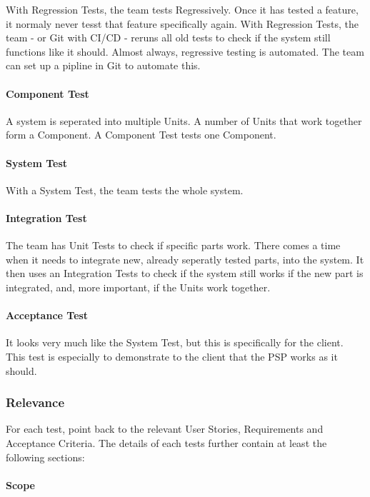 \documentclass[10pt]{report}
\begin{document}
With Regression Tests, the team tests Regressively. Once it has tested a feature, it normaly never tesst that feature specifically again. With Regression Tests, the team - or Git with CI/CD - reruns all old tests to check if the system still functions like it should. Almost always, regressive testing is automated. The team can set up a pipline in Git to automate this.

\paragraph{Component Test}

A system is seperated into multiple Units. A number of Units that work together form a Component. A Component Test tests one Component.

\paragraph{System Test}

With a System Test, the team tests the whole system.

\paragraph{Integration Test}

The team has Unit Tests to check if specific parts work. There comes a time when it needs to integrate new, already seperatly tested parts, into the system. It then uses an Integration Tests to check if the system still works if the new part is integrated, and, more important, if the Units work together.

\paragraph{Acceptance Test}

It looks very much like the System Test, but this is specifically for the client. This test is especially to demonstrate to the client that the PSP works as it should.

\subsubsection{Relevance}

For each test, point back to the relevant User Stories, Requirements and Acceptance Criteria. The details of each tests further contain at least the following sections:

\paragraph{Scope}
\end{document}
